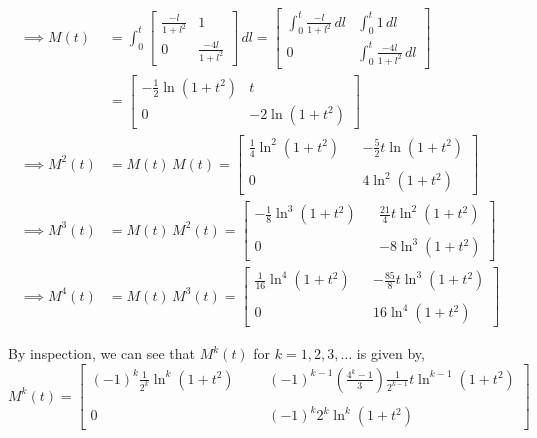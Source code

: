 \begin{align*}
    \implies
    M(t)
        & =
    \int_{0}^{t}
    \begin{bmatrix}
        \frac{-l}{1+l^2} & 1                 \\
        0                & \frac{-4l}{1+l^2}
    \end{bmatrix}
    \, dl
    =
    \begin{bmatrix}
        \int_{0}^{t} \frac{-l}{1+l^2} \, dl
        &
        \int_{0}^{t} 1 \, dl
        \\
        0
        &
        \int_{0}^{t} \frac{-4l}{1+l^2} \, dl
    \end{bmatrix}
    \\ & =
    \begin{bmatrix}
        -\frac{1}{2} \ln(1+t^2)
        &
        t
        \\
        0
        &
        -2 \ln(1+t^2)
    \end{bmatrix}
    \\
    \implies
    M^2(t)
    & =
    M(t) \, M(t)
    =
    \begin{bmatrix}
        \frac{1}{4} \ln^2(1+t^2)
        & &
        -\frac{5}{2} t \ln(1+t^2)
        \\ \\
        0
        & &
        4 \ln^2(1+t^2)
    \end{bmatrix}
    \\
    \implies
    M^3(t)
    & =
    M(t) \, M^2(t)
    =
    \begin{bmatrix}
        -\frac{1}{8} \ln^3(1+t^2)
        & &
        \frac{21}{4} t \ln^2(1+t^2)
        \\ \\
        0
        & &
        -8 \ln^3(1+t^2)
    \end{bmatrix}
    \\
    \implies
    M^4(t)
    & =
    M(t) \, M^3(t)
    =
    \begin{bmatrix}
        \frac{1}{16} \ln^4(1+t^2)
        & &
        -\frac{85}{8} t \ln^3(1+t^2)
        \\ \\
        0
        & &
        16 \ln^4(1+t^2)
    \end{bmatrix}
\end{align*}

By inspection, we can see that \( M^{k} (t) \) for \( k = 1, 2, 3, \ldots \) is given by,
\begin{equation*}
    M^{k} (t)
    =
    \begin{bmatrix}
        \displaystyle
        {(-1)}^{k} \frac{1}{2^k} \ln^{k}(1+t^2)
        & & &
        \displaystyle
        {(-1)}^{k-1} \left( \frac{4^k-1}{3} \right) \frac{1}{2^{k-1}} t \ln^{k-1}(1+t^2)
        \\ \\
        0
        & & &
        \displaystyle
        {(-1)}^{k} 2^{k} \ln^{k}(1+t^2)
    \end{bmatrix}
\end{equation*}

